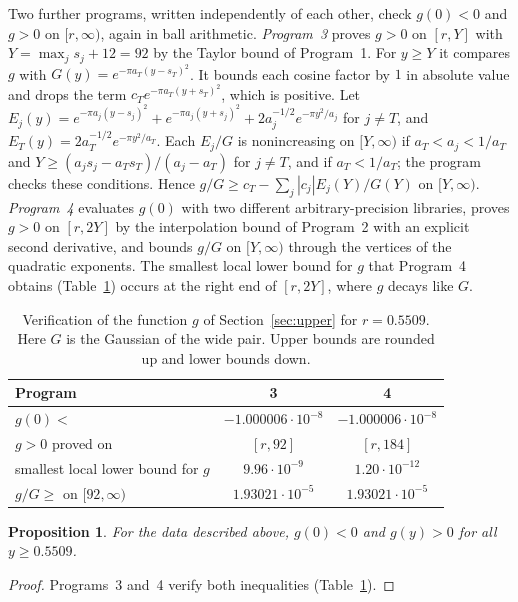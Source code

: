 \documentclass[11pt]{amsart}
\newtheorem{proposition}[theorem]{Proposition}
\theoremstyle{definition}
\theoremstyle{remark}
\numberwithin{equation}{section}
\newcommand{\rPdec}{0.5509}
\newcommand{\cTP}{1.93021\cdot10^{-5}}
\newcommand{\gzeroP}{-1.000006\cdot10^{-8}}
\newcommand{\YP}{92}
\newcommand{\YPtwo}{184}
\newcommand{\lbPthree}{9.96\cdot10^{-9}}
\newcommand{\lbPfour}{1.20\cdot10^{-12}}
\begin{document}
Two further programs, written independently of each other, check $g(0)<0$ and $g>0$ on $[r,\infty)$, again in ball arithmetic. \emph{Program~3} proves $g>0$ on $[r,Y]$ with $Y=\max_js_j+12=\YP$ by the Taylor bound of Program~1. For $y\ge Y$ it compares $g$ with $G(y)=e^{-\pi a_T(y-s_T)^2}$. It bounds each cosine factor by $1$ in absolute value and drops the term $c_Te^{-\pi a_T(y+s_T)^2}$, which is positive. Let $E_j(y)=e^{-\pi a_j(y-s_j)^2}+e^{-\pi a_j(y+s_j)^2}+2a_j^{-1/2}e^{-\pi y^2/a_j}$ for $j\ne T$, and $E_T(y)=2a_T^{-1/2}e^{-\pi y^2/a_T}$. Each $E_j/G$ is nonincreasing on $[Y,\infty)$ if $a_T<a_j<1/a_T$ and $Y\ge(a_js_j-a_Ts_T)/(a_j-a_T)$ for $j\ne T$, and if $a_T<1/a_T$; the program checks these conditions. Hence $g/G\ge c_T-\sum_j|c_j|E_j(Y)/G(Y)$ on $[Y,\infty)$. \emph{Program~4} evaluates $g(0)$ with two different arbitrary-precision libraries, proves $g>0$ on $[r,2Y]$ by the interpolation bound of Program~2 with an explicit second derivative, and bounds $g/G$ on $[Y,\infty)$ through the vertices of the quadratic exponents. The smallest local lower bound for $g$ that Program~4 obtains (Table~\ref{tab:upper}) occurs at the right end of $[r,2Y]$, where $g$ decays like $G$.

\begin{table}[ht]
\centering
\caption{Verification of the function $g$ of Section~\ref{sec:upper} for $r=\rPdec$. Here $G$ is the Gaussian of the wide pair. Upper bounds are rounded up and lower bounds down.}\label{tab:upper}
\small
\begin{tabular}{@{}lcc@{}}
\toprule
Program & 3 & 4\\
\midrule
$g(0)<$ & $\gzeroP$ & $\gzeroP$\\
$g>0$ proved on & $[r,\YP]$ & $[r,\YPtwo]$\\
smallest local lower bound for $g$ & $\lbPthree$ & $\lbPfour$\\
$g/G\ge$ on $[\YP,\infty)$ & $\cTP$ & $\cTP$\\
\bottomrule
\end{tabular}
\end{table}

\begin{proposition}\label{prop:upper}
For the data described above, $g(0)<0$ and $g(y)>0$ for all $y\ge\rPdec$.
\end{proposition}

\begin{proof}
Programs~3 and~4 verify both inequalities (Table~\ref{tab:upper}).
\end{proof}
\end{document}
